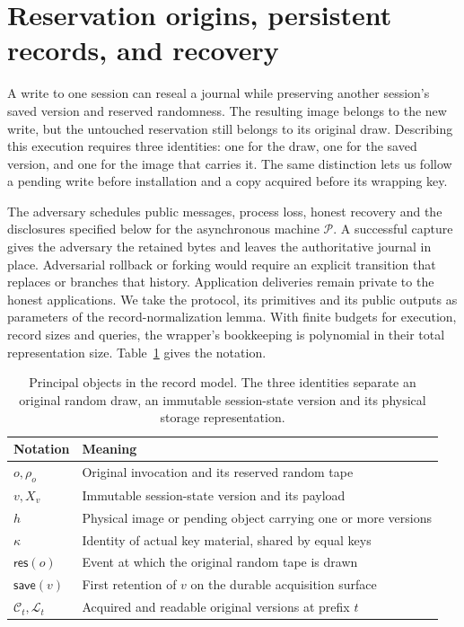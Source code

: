 
\section{Reservation origins, persistent records, and recovery}
\label{sec:security-model}

A write to one session can reseal a journal while preserving another
session's saved version and reserved randomness. The resulting image
belongs to the new write, but the untouched reservation still belongs
to its original draw. Describing this execution requires three identities:
one for the draw, one for the saved version, and one for the image that
carries it. The same distinction lets us follow a pending write before
installation and a copy acquired before its wrapping key.

The adversary schedules public messages, process loss, honest recovery
and the disclosures specified below for the asynchronous machine
$\mathcal P$. A successful capture gives the adversary the retained
bytes and leaves the authoritative journal in place. Adversarial rollback
or forking would require an explicit transition that replaces or branches
that history. Application deliveries remain private to the honest
applications. We take the protocol, its primitives and its public
outputs as parameters of the record-normalization lemma. With finite
budgets for execution, record sizes and queries, the wrapper's bookkeeping
is polynomial in their total representation size.
Table~\ref{tab:record-notation} gives the notation.

\begin{table}[t]
\centering
\caption{Principal objects in the record model. The three identities separate
an original random draw, an immutable session-state version and its physical
storage representation.}
\label{tab:record-notation}
\small
\begin{tabularx}{\linewidth}{@{}>{\raggedright\arraybackslash}p{.25\linewidth}X@{}}
\toprule
Notation & Meaning\\
\midrule
$o,\rho_o$ & Original invocation and its reserved random tape\\
$v,X_v$ & Immutable session-state version and its payload\\
$h$ & Physical image or pending object carrying one or more versions\\
$\kappa$ & Identity of actual key material, shared by equal keys\\
$\mathsf{res}(o)$ & Event at which the original random tape is drawn\\
$\mathsf{save}(v)$ & First retention of $v$ on the durable acquisition surface\\
$\mathcal C_t,\mathcal L_t$ & Acquired and readable original versions at prefix $t$\\
\bottomrule
\end{tabularx}
\end{table}

